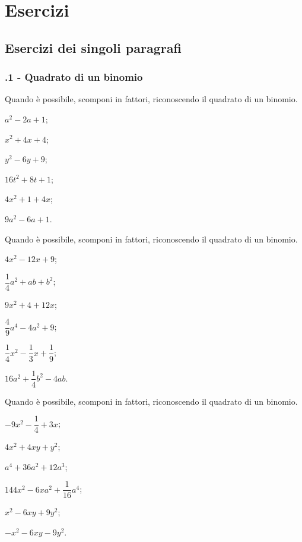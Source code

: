 \section{Esercizi}
\subsection{Esercizi dei singoli paragrafi}
\subsubsection*{\thechapter.1 - Quadrato di un binomio}
\begin{multicols}{2}
\begin{esercizio}
\label{ese:16.1}
Quando è possibile, scomponi in fattori, riconoscendo il quadrato di un binomio.
\begin{enumeratea}
 \item $a^{2}-2a+1$;
 \item $x^{2}+4x+4$;
 \item $y^{2}-6y+9$;
 \item $16t^{2}+8t+1$;
 \item $4x^{2}+1+4x$;
 \item $9a^{2}-6a+1$.
\end{enumeratea}
\end{esercizio}

\begin{esercizio}
\label{ese:16.2}
Quando è possibile, scomponi in fattori, riconoscendo il quadrato di un binomio.
\begin{enumeratea}
 \item $4x^{2}-12x+9$;
 \item $\dfrac{1}{4}a^{2}+ab+b^{2}$;
 \item $9x^{2}+4+12x$;
 \item $\dfrac{4}{9}a^{{4}}-4a^{2}+9$;
 \item $\dfrac{1}{4}x^{2}-\dfrac{1}{3}x+\dfrac{1}{9}$;
 \item $16a^{2}+\dfrac{1}{4}b^{2}-4ab$.
\end{enumeratea}
\end{esercizio}

\begin{esercizio}
\label{ese:16.3}
Quando è possibile, scomponi in fattori, riconoscendo il quadrato di un binomio.
\begin{enumeratea}
 \item $-9x^{2}-\dfrac{1}{4}+3x$;
 \item $4x^{2}+4xy+y^{2}$;
 \item $a^{4}+36a^{2}+12a^{3}$;
 \item $144x^{2}-6xa^{2}+\dfrac{1}{16}a^{4}$;
 \item $x^{2}-6xy+9y^{2}$;
 \item $-x^{2}-6xy-9y^{2}$.
\end{enumeratea}
\end{esercizio}


\end{multicols}
